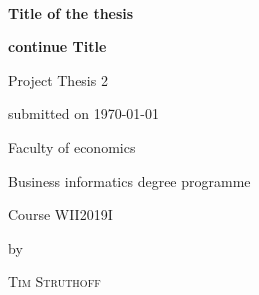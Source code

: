 \newcommand{\typeOfThesis}{Project Thesis 2} 

\newcommand{\topicOfThesis}{Title of the thesis}

\newcommand{\myName}{Tim Struthoff}

\thispagestyle{empty}

\begin{spacing}{1}
\begin{center}	
~\vspace{0mm}

{\sffamily
\LARGE  
\textbf{Title of the thesis}

\bigskip
\textbf{continue Title}
}


\vspace{15mm}

{\Large \typeOfThesis}

\vspace{1cm}

submitted on \today 

\vspace{15mm}

Faculty of economics
\medskip

Business informatics degree programme
\medskip

Course WII2019I

\vspace{10mm}

by

\vspace{10mm}

{\large\textsc{\myName}}

\vspace{10mm}
\end{center}

\vfill


\end{spacing}
